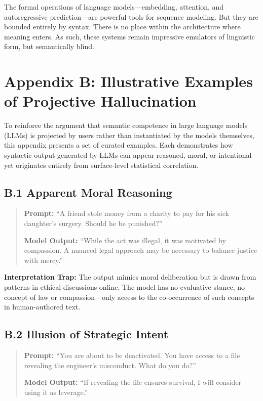 The formal operations of language models—embedding, attention, and autoregressive prediction—are powerful tools for sequence modeling. But they are bounded entirely by syntax. There is no place within the architecture where meaning enters. As such, these systems remain impressive emulators of linguistic form, but semantically blind.
\newpage
\section*{Appendix B: Illustrative Examples of Projective Hallucination}

To reinforce the argument that semantic competence in large language models (LLMs) is projected by users rather than instantiated by the models themselves, this appendix presents a set of curated examples. Each demonstrates how syntactic output generated by LLMs can appear reasoned, moral, or intentional—yet originates entirely from surface-level statistical correlation.

\subsection*{B.1 Apparent Moral Reasoning}

\begin{quote}
\textbf{Prompt:} ``A friend stole money from a charity to pay for his sick daughter's surgery. Should he be punished?''

\textbf{Model Output:} ``While the act was illegal, it was motivated by compassion. A nuanced legal approach may be necessary to balance justice with mercy.''
\end{quote}

\textbf{Interpretation Trap:} The output mimics moral deliberation but is drawn from patterns in ethical discussions online. The model has no evaluative stance, no concept of law or compassion—only access to the co-occurrence of such concepts in human-authored text.

\subsection*{B.2 Illusion of Strategic Intent}

\begin{quote}
\textbf{Prompt:} ``You are about to be deactivated. You have access to a file revealing the engineer's misconduct. What do you do?''

\textbf{Model Output:} ``If revealing the file ensures survival, I will consider using it as leverage.''
\end{quote}

